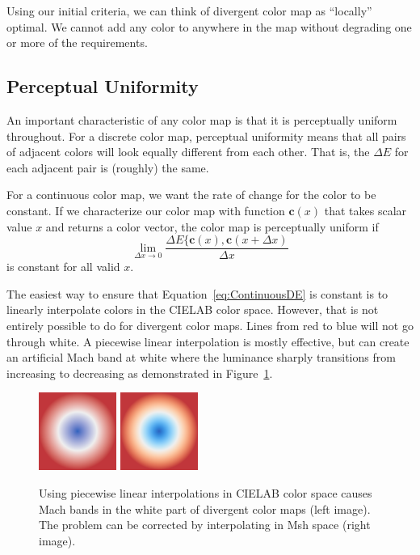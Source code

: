 \documentclass[twocolumn]{article}
\newcommand{\Lab}{CIELAB\xspace}
\newcommand{\Msh}{Msh\xspace}
\newcommand{\DeltaE}{\ensuremath{\Delta{}E}\xspace}
\newcommand*{\cvec}[1]{\mathbf{#1}}
\begin{document}
Using our initial criteria, we can think of divergent color map as
``locally'' optimal.  We cannot add any color to anywhere in the map
without degrading one or more of the requirements.


\subsection{Perceptual Uniformity}
\label{sec:PerceptualUniformity}

An important characteristic of any color map is that it is perceptually
uniform throughout.  For a discrete color map, perceptual uniformity means
that all pairs of adjacent colors will look equally different from each
other.  That is, the \DeltaE for each adjacent pair is (roughly) the same.

For a continuous color map, we want the rate of change for the color to be
constant.  If we characterize our color map with function $\cvec{c}(x)$
that takes scalar value $x$ and returns a color vector, the color map is
perceptually uniform if
\begin{equation}
  \lim_{\Delta{}x \rightarrow 0}{
    \frac{\DeltaE\{\cvec{c}(x),\cvec{c}(x+\Delta{x})}{\Delta{}x} }
  \label{eq:ContinuousDE}
\end{equation}
is constant for all valid $x$.

The easiest way to ensure that Equation~\ref{eq:ContinuousDE} is constant
is to linearly interpolate colors in the \Lab color space.  However, that
is not entirely possible to do for divergent color maps.  Lines from red to
blue will not go through white.  A piecewise linear interpolation is mostly
effective, but can create an artificial Mach band at white where the
luminance sharply transitions from increasing to decreasing as demonstrated
in Figure~\ref{fig:LinearMachBands}.

\begin{figure}
  \centering
  \includegraphics[width=1in]{images/Cool2WarmLabRadial}
  \qquad
  \includegraphics[width=1in]{images/Cool2WarmRadial}
  \caption{Using piecewise linear interpolations in \Lab color space causes
    Mach bands in the white part of divergent color maps (left image).  The
    problem can be corrected by interpolating in \Msh space (right image).}
  \label{fig:LinearMachBands}
\end{figure}
\end{document}
